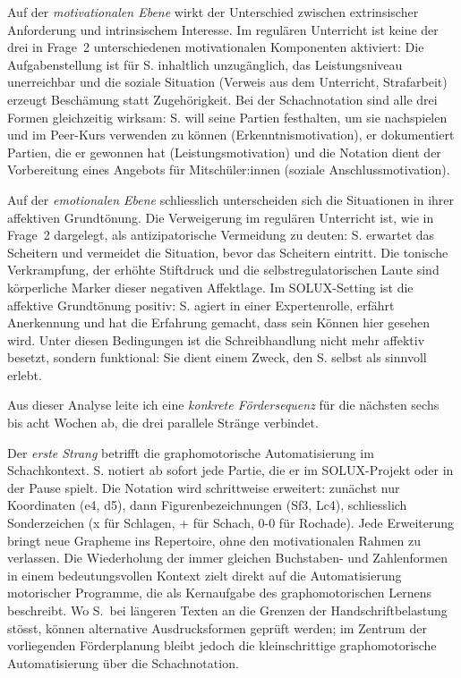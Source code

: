 \documentclass[ngerman, a4paper]{article}
\begin{document}
Auf der \textit{motivationalen Ebene} wirkt der Unterschied zwischen extrinsischer
Anforderung und intrinsischem Interesse. Im regulären Unterricht ist
keine der drei in Frage~2 unterschiedenen motivationalen Komponenten
aktiviert: Die Aufgabenstellung ist für S. inhaltlich
unzugänglich, das Leistungsniveau unerreichbar und die soziale Situation (Verweis
aus dem Unterricht, Strafarbeit) erzeugt Beschämung statt Zugehörigkeit. Bei der
Schachnotation sind alle drei Formen gleichzeitig wirksam: S. will seine Partien
festhalten, um sie nachspielen und im Peer-Kurs verwenden zu können
(Erkenntnismotivation), er dokumentiert Partien, die er gewonnen hat
(Leistungsmotivation) und die Notation dient der Vorbereitung eines Angebots
für Mitschüler:innen (soziale Anschlussmotivation).

Auf der \textit{emotionalen Ebene} schliesslich unterscheiden sich die Situationen
in ihrer affektiven Grundtönung. Die Verweigerung im regulären Unterricht ist,
wie in Frage~2 dargelegt, als antizipatorische Vermeidung zu deuten: S. erwartet
das Scheitern und vermeidet die Situation, bevor das Scheitern eintritt. Die
tonische Verkrampfung, der erhöhte Stiftdruck und die selbstregulatorischen Laute
sind körperliche Marker dieser negativen Affektlage. Im SOLUX-Setting ist die
affektive Grundtönung positiv: S. agiert in einer Expertenrolle, erfährt
Anerkennung und hat die Erfahrung gemacht, dass sein Können hier gesehen wird.
Unter diesen Bedingungen ist die Schreibhandlung nicht mehr affektiv besetzt,
sondern funktional: Sie dient einem Zweck, den S. selbst als sinnvoll erlebt.

Aus dieser Analyse leite ich eine \textit{konkrete Fördersequenz} für die nächsten
sechs bis acht Wochen ab, die drei parallele Stränge verbindet.

Der \textit{erste Strang} betrifft die graphomotorische Automatisierung im
Schachkontext. S. notiert ab sofort jede Partie, die er im SOLUX-Projekt oder
in der Pause spielt. Die Notation wird schrittweise erweitert: zunächst nur
Koordinaten (e4, d5), dann Figurenbezeichnungen (Sf3, Lc4), schliesslich
Sonderzeichen (x für Schlagen, + für Schach, 0-0 für Rochade). Jede Erweiterung
bringt neue Grapheme ins Repertoire, ohne den motivationalen Rahmen zu verlassen.
Die Wiederholung der immer gleichen Buchstaben- und Zahlenformen in einem
bedeutungsvollen Kontext zielt direkt auf die Automatisierung motorischer
Programme, die \textcite[S.\,1--4]{sturm2016graphomotorik} als Kernaufgabe des graphomotorischen Lernens beschreibt.
Wo S.\ bei längeren Texten an die Grenzen
der Handschriftbelastung stösst, können alternative Ausdrucksformen geprüft
werden; im Zentrum der vorliegenden Förderplanung bleibt jedoch die
kleinschrittige graphomotorische Automatisierung über die Schachnotation.
\end{document}
